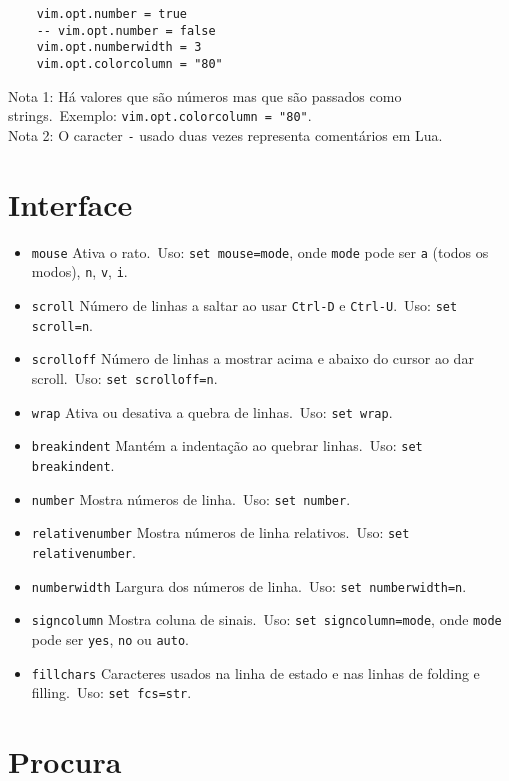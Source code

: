 \begin{lstlisting}
    vim.opt.number = true
    -- vim.opt.number = false
    vim.opt.numberwidth = 3
    vim.opt.colorcolumn = "80"
\end{lstlisting}

\noindent Nota 1: Há valores que são números mas que são passados como strings.\ Exemplo: \texttt{vim.opt.colorcolumn = "80"}.\\
Nota 2: O caracter \texttt{-} usado duas vezes representa comentários em Lua.

\section{Interface}

\begin{itemize}
    \setlength{\itemsep}{-5pt} %
    \item \texttt{mouse} Ativa o rato.\ Uso: \texttt{set mouse=mode}, onde \texttt{mode} pode ser \texttt{a} (todos os modos), \texttt{n}, \texttt{v}, \texttt{i}.
    \item \texttt{scroll} Número de linhas a saltar ao usar \texttt{Ctrl-D} e \texttt{Ctrl-U}.\ Uso: \texttt{set scroll=n}.
    \item \texttt{scrolloff} Número de linhas a mostrar acima e abaixo do cursor ao dar scroll.\ Uso: \texttt{set scrolloff=n}.
    \item \texttt{wrap} Ativa ou desativa a quebra de linhas.\ Uso: \texttt{set wrap}.
    \item \texttt{breakindent} Mantém a indentação ao quebrar linhas.\ Uso: \texttt{set breakindent}.
    \item \texttt{number} Mostra números de linha.\ Uso: \texttt{set number}.
    \item \texttt{relativenumber} Mostra números de linha relativos.\ Uso: \texttt{set relativenumber}.
    \item \texttt{numberwidth} Largura dos números de linha.\ Uso: \texttt{set numberwidth=n}.
    \item \texttt{signcolumn} Mostra coluna de sinais.\ Uso: \texttt{set signcolumn=mode}, onde \texttt{mode} pode ser \texttt{yes}, \texttt{no} ou \texttt{auto}.
    \item \texttt{fillchars} Caracteres usados na linha de estado e nas linhas de folding e filling.\ Uso: \texttt{set fcs=str}.
\end{itemize}

\section{Procura}

